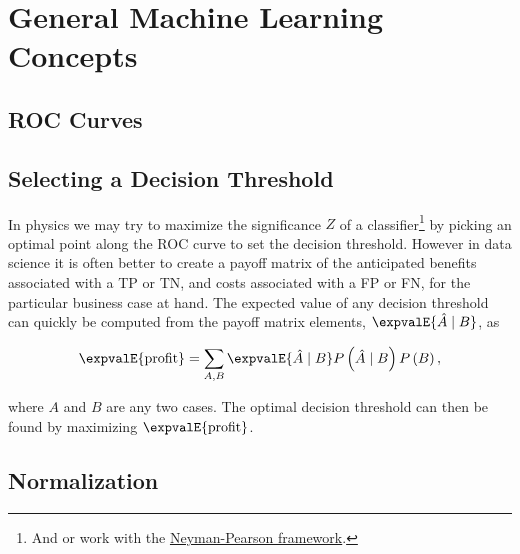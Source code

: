 \section{General Machine Learning Concepts}
\label{additional:ml:general}

\subsection{ROC Curves}
\label{additional:ml:general:eval:ROC}

\subsection{Selecting a Decision Threshold}
\label{additional:ml:general:eval:decision_threshold}


In physics we may try to maximize the significance $Z$ of a classifier\footnote{And or
work with the \href{https://en.wikipedia.org/wiki/Neyman\%E2\%80\%93Pearson\_lemma}{Neyman-Pearson framework}.} by
picking an optimal point along the ROC curve to set the decision threshold.
However in data science it is often better to create a payoff matrix of the anticipated
benefits associated with a TP or TN, and costs associated with a FP or FN,
for the particular business case at hand.
The expected value of any decision threshold can quickly be computed
from the payoff matrix elements, $\expvalE{\hat{A} \mid B}$, as

\begin{equation} \label{eq:E_profit}
\expvalE{\text{profit}} = \sum_{A,B} \expvalE{\hat{A} \mid B} P\left(\hat{A} \mid B \right) P\left(B\right),
\end{equation}

\noindent where $A$ and $B$ are any two cases.
The optimal decision threshold can then be found by maximizing $\expvalE{\text{profit}}$.

\subsection{Normalization}
\label{additional:ml:general:normalization}

